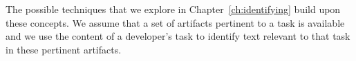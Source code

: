 The possible techniques that we explore in Chapter~\ref{ch:identifying} 
build upon these concepts. We assume that 
a set of artifacts pertinent to a task 
is available and we use the content of a developer's task 
to identify text relevant to that task
in these pertinent artifacts.














